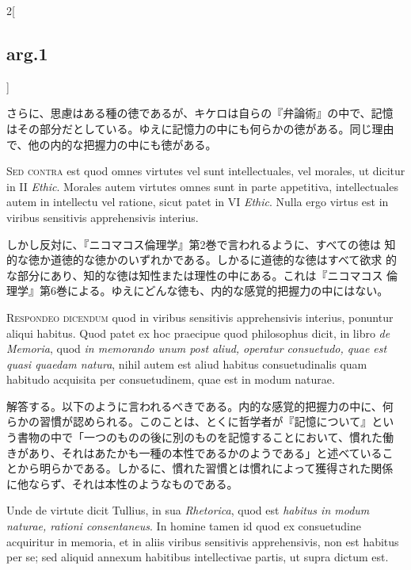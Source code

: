 \documentclass[paper=a4paper,fontsize=10pt,jafontsize=9pt,titlepage]{jlreq}
\begin{document}
\begin{paracol}{2}[\subsection{arg.1}]
\switchcolumn

さらに、思慮はある種の徳であるが、キケロは自らの『弁論術』の中で、記憶
はその部分だとしている。ゆえに記憶力の中にも何らかの徳がある。同じ理由
で、他の内的な把握力の中にも徳がある。

\switchcolumn*[\subsection{s.c.}]

{\scshape Sed contra} est quod omnes virtutes vel sunt intellectuales,
vel morales, ut dicitur in II {\itshape Ethic}. Morales autem virtutes
omnes sunt in parte appetitiva, intellectuales autem in intellectu vel
ratione, sicut patet in VI {\itshape Ethic}. Nulla ergo virtus est in
viribus sensitivis apprehensivis interius.

\switchcolumn

しかし反対に、『ニコマコス倫理学』第2巻で言われるように、すべての徳は
知的な徳か道徳的な徳かのいずれかである。しかるに道徳的な徳はすべて欲求
的な部分にあり、知的な徳は知性または理性の中にある。これは『ニコマコス
倫理学』第6巻による。ゆえにどんな徳も、内的な感覚的把握力の中にはない。


{\scshape Respondeo dicendum} quod in viribus sensitivis
 apprehensivis interius, ponuntur aliqui habitus. Quod patet ex hoc
 praecipue quod philosophus dicit, in libro {\itshape de Memoria},
 quod {\itshape in memorando unum post aliud, operatur consuetudo,
 quae est quasi quaedam natura}, nihil autem est aliud habitus
 consuetudinalis quam habitudo acquisita per consuetudinem, quae est
 in modum naturae.

\switchcolumn

解答する。以下のように言われるべきである。内的な感覚的把握力の中に、何
らかの習慣が認められる。このことは、とくに哲学者が『記憶について』とい
う書物の中で「一つのものの後に別のものを記憶することにおいて、慣れた働
きがあり、それはあたかも一種の本性であるかのようである」と述べているこ
とから明らかである。しかるに、慣れた習慣とは慣れによって獲得された関係
に他ならず、それは本性のようなものである。

\switchcolumn*

Unde de virtute dicit Tullius, in sua {\itshape Rhetorica}, quod est
 {\itshape habitus in modum naturae, rationi consentaneus}. In homine
 tamen id quod ex consuetudine acquiritur in memoria, et in aliis
 viribus sensitivis apprehensivis, non est habitus per se; sed aliquid
 annexum habitibus intellectivae partis, ut supra dictum est.


\end{paracol}
\end{document}
